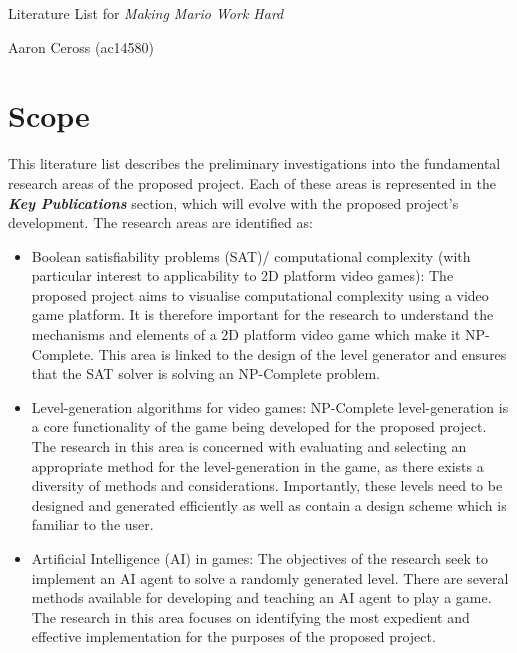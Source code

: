 \documentclass[a4paper]{article}
\begin{document}
\begin{center}\huge Literature List for \textit{Making Mario Work Hard}
\par \Large Aaron Ceross (ac14580)
\end{center}
\vspace{-10mm}
\par \noindent

\section{Scope}

\vspace{-5mm}
\par \noindent This literature list describes the preliminary investigations into the fundamental research areas of the proposed project. Each of these areas is represented in the \textit{\textbf{Key Publications}} section, which will evolve with the proposed project’s development. The research areas are identified as:
\vspace{-5mm}

\begin{itemize}
  \item Boolean satisfiability problems (SAT)/ computational complexity (with particular interest to applicability to 2D platform video games): The proposed project aims to visualise computational complexity using a video game platform. It is therefore important for the research to understand the mechanisms and elements of a 2D platform video game which make it NP-Complete. This area is linked to the design of the level generator and ensures that the SAT solver is solving an NP-Complete problem.

  \item Level-generation algorithms for video games: NP-Complete level-generation is a core functionality of the game being developed for the proposed project. The research in this area is concerned with evaluating and selecting an appropriate method for the level-generation in the game, as there exists a diversity of methods and considerations. Importantly, these levels need to be designed and generated efficiently as well as contain a design scheme which is familiar to the user.

  \item Artificial Intelligence (AI) in games: The objectives of the research seek to implement an AI agent to solve a randomly generated level. There are several methods available for developing and teaching an AI agent to play a game. The research in this area focuses on identifying the most expedient and effective implementation for the purposes of the proposed project.
\end{itemize}
\end{document}
